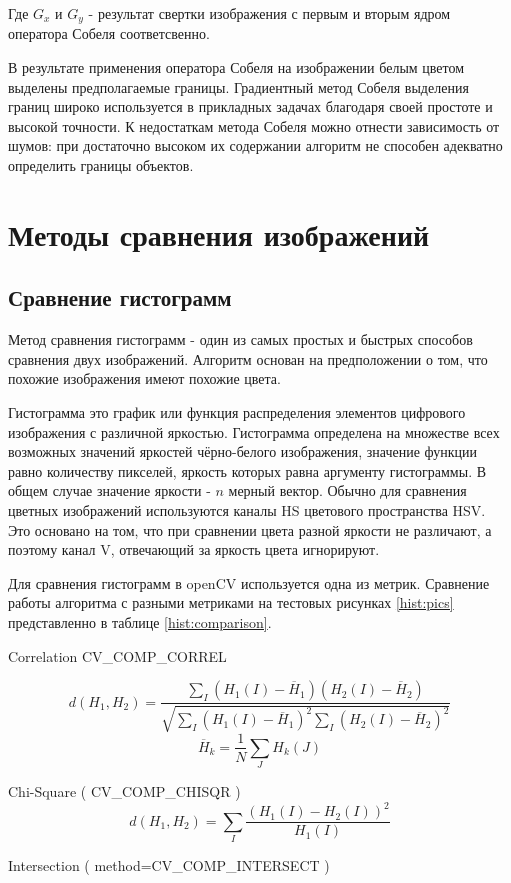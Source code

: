 \documentclass[oneside,final,14pt]{extreport}
\begin{document}
Где $G_x$ и $G_y$ - результат свертки изображения с первым и вторым ядром оператора Собеля соответсвенно.
 
В результате применения оператора Собеля на изображении белым цветом выделены предполагаемые границы. Градиентный метод Собеля выделения границ широко используется в прикладных задачах благодаря своей простоте и высокой точности. К недостаткам метода Собеля можно отнести зависимость от шумов: при достаточно высоком их содержании алгоритм не способен адекватно определить границы объектов.



\chapter{Методы сравнения изображений}
\section{Сравнение гистограмм}
Метод сравнения гистограмм - один из самых простых и быстрых способов сравнения  двух изображений. Алгоритм основан на предположении о том, что похожие изображения имеют похожие цвета. 

Гистограмма это график  или функция распределения элементов цифрового изображения с различной яркостью. Гистограмма определена на множестве всех возможных значений яркостей чёрно-белого изображения, значение функции равно количеству пикселей, яркость которых равна аргументу гистограммы. В общем случае значение яркости - $n$ мерный вектор. Обычно для сравнения цветных изображений используются каналы HS цветового пространства HSV. Это основано на том, что при сравнении цвета разной яркости не различают, а поэтому канал V, отвечающий за яркость цвета игнорируют.  

Для сравнения гистограмм в openCV используется одна из метрик. Сравнение работы алгоритма с разными метриками на тестовых рисунках \ref{hist:pics} представленно в таблице \ref{hist:comparison}.  

Correlation  CV\_COMP\_CORREL
 
$$
d(H_1,H_2) 
= 
\frac{
\sum_I(H_1(I) - \overline{H}_1)
(H_2(I)-\overline{H}_2)
}{
	\sqrt{
		\sum_I(H_1(I) - \overline{H}_1)^2
		\sum_I(H_2(I) - \overline{H}_2)^2
	}
}
$$
$$
\overline{H}_k 
= 
\frac{1}{N}
\sum_J H_k(J)
$$

Chi-Square ( CV\_COMP\_CHISQR )
$$
d(H_1,H_2)
=
\sum_I \frac{
	(H_1(I) - H_2(I))^2}
{H_1(I)}
$$

Intersection ( method=CV\_COMP\_INTERSECT )
\end{document}
